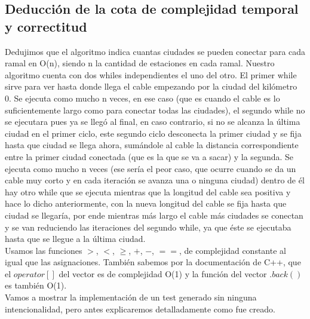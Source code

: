 \subsection{Deducción de la cota de complejidad temporal y correctitud}


Dedujimos que el algoritmo indica cuantas ciudades se pueden conectar para cada ramal en O(n), siendo n la cantidad de estaciones en cada ramal. Nuestro algoritmo cuenta con dos whiles independientes el uno del otro. El primer while sirve para ver hasta donde llega el cable empezando por la ciudad del kilómetro 0. Se ejecuta como mucho n veces, en ese caso (que es cuando el cable es lo suficientemente largo como para conectar todas las ciudades), el segundo while no se ejecutara pues ya se llegó al final, en caso contrario, si no se alcanza la última ciudad en el primer ciclo, este segundo ciclo desconecta la primer ciudad y se fija hasta que ciudad se llega ahora, sumándole al cable la distancia correspondiente entre la primer ciudad conectada (que es la que se va a sacar) y la segunda. Se ejecuta como mucho n veces (ese sería el peor caso, que ocurre cuando se da un cable muy corto y en cada iteración se avanza una o ninguna ciudad) dentro de él hay otro while que se ejecuta mientras que la longitud del cable sea positiva y hace lo dicho anteriormente, con la nueva longitud del cable se fija hasta que ciudad se llegaría, por ende mientras más largo el cable más ciudades se conectan y se van reduciendo las iteraciones del segundo while, ya que éste se ejecutaba hasta que se llegue a la última ciudad.\\

Usamos las funciones $>$, $<$, $\geq$, $+$, $-$, $==$, de complejidad constante al igual que las asignaciones. También sabemos por la documentación de C++, que el $operator[]$ del vector es de complejidad O(1) y la función del vector $.back()$ es también O(1).\\

Vamos a mostrar la implementación de un test generado sin ninguna intencionalidad, pero antes explicaremos detalladamente como fue creado. \\

